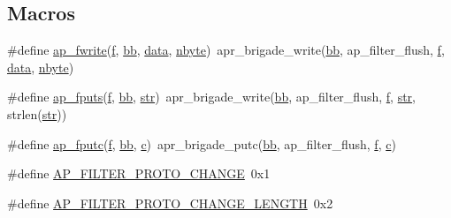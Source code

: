 \subsection*{Macros}
\begin{DoxyCompactItemize}
\item 
\#define \hyperlink{group__APACHE__CORE__FILTER_ga05d620ebb0185c487e48d3e35df79bcd}{ap\+\_\+fwrite}(\hyperlink{pcregrep_8txt_a588c778c1c1509e472f22dc36efb005e}{f},  \hyperlink{group__MOD__PROXY_ga9313a8a2814cff280d5d780c723def3c}{bb},  \hyperlink{structdata}{data},  \hyperlink{group__APR__Util__Bucket__Brigades_ga19a56d6f9dcf813c74420f84a3d1c062}{nbyte})~apr\+\_\+brigade\+\_\+write(\hyperlink{group__MOD__PROXY_ga9313a8a2814cff280d5d780c723def3c}{bb}, ap\+\_\+filter\+\_\+flush, \hyperlink{pcregrep_8txt_a588c778c1c1509e472f22dc36efb005e}{f}, \hyperlink{structdata}{data}, \hyperlink{group__APR__Util__Bucket__Brigades_ga19a56d6f9dcf813c74420f84a3d1c062}{nbyte})
\item 
\#define \hyperlink{group__APACHE__CORE__FILTER_ga40e866c020cdbc18f0ad0a430d9231bb}{ap\+\_\+fputs}(\hyperlink{pcregrep_8txt_a588c778c1c1509e472f22dc36efb005e}{f},  \hyperlink{group__MOD__PROXY_ga9313a8a2814cff280d5d780c723def3c}{bb},  \hyperlink{group__APR__Util__Bucket__Brigades_ga6a62b60443be1d042194af15ce934193}{str})~apr\+\_\+brigade\+\_\+write(\hyperlink{group__MOD__PROXY_ga9313a8a2814cff280d5d780c723def3c}{bb}, ap\+\_\+filter\+\_\+flush, \hyperlink{pcregrep_8txt_a588c778c1c1509e472f22dc36efb005e}{f}, \hyperlink{group__APR__Util__Bucket__Brigades_ga6a62b60443be1d042194af15ce934193}{str}, strlen(\hyperlink{group__APR__Util__Bucket__Brigades_ga6a62b60443be1d042194af15ce934193}{str}))
\item 
\#define \hyperlink{group__APACHE__CORE__FILTER_ga75f41a49d4cc41263df38502abdce03b}{ap\+\_\+fputc}(\hyperlink{pcregrep_8txt_a588c778c1c1509e472f22dc36efb005e}{f},  \hyperlink{group__MOD__PROXY_ga9313a8a2814cff280d5d780c723def3c}{bb},  \hyperlink{pcregrep_8txt_aef720ae5f62fa015619d00171d917416}{c})~apr\+\_\+brigade\+\_\+putc(\hyperlink{group__MOD__PROXY_ga9313a8a2814cff280d5d780c723def3c}{bb}, ap\+\_\+filter\+\_\+flush, \hyperlink{pcregrep_8txt_a588c778c1c1509e472f22dc36efb005e}{f}, \hyperlink{pcregrep_8txt_aef720ae5f62fa015619d00171d917416}{c})
\item 
\#define \hyperlink{group__APACHE__CORE__FILTER_ga1e0ebc72e7e221c1fa62e81e3a8b3e25}{A\+P\+\_\+\+F\+I\+L\+T\+E\+R\+\_\+\+P\+R\+O\+T\+O\+\_\+\+C\+H\+A\+N\+GE}~0x1
\item 
\#define \hyperlink{group__APACHE__CORE__FILTER_ga45a85db5961f6aa2975acb30a7ba020e}{A\+P\+\_\+\+F\+I\+L\+T\+E\+R\+\_\+\+P\+R\+O\+T\+O\+\_\+\+C\+H\+A\+N\+G\+E\+\_\+\+L\+E\+N\+G\+TH}~0x2

\end{DoxyCompactItemize}
